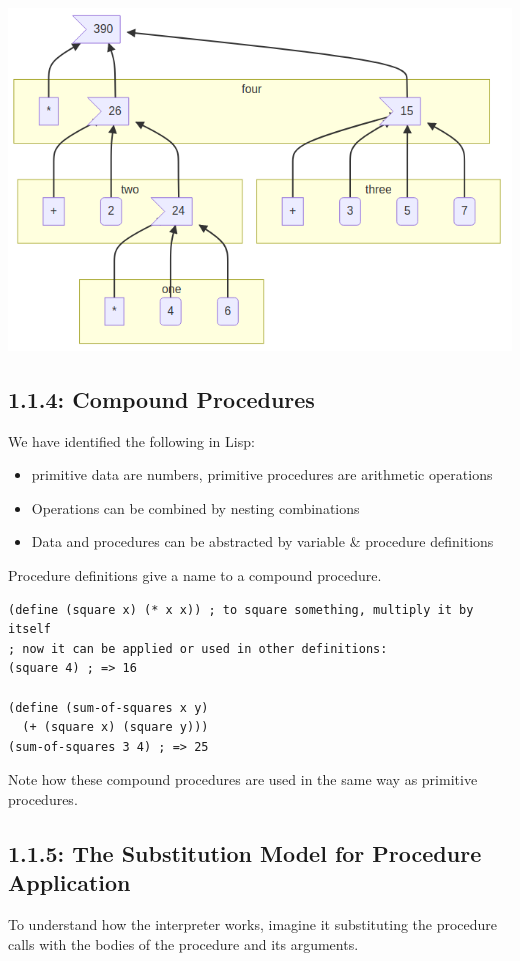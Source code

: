 \documentclass[final,fleqn,titlepage,twoside]{article}
\begin{document}
\begin{center}
\includegraphics[width=.9\linewidth]{1/fig/t_1-1-3.png}
\end{center}

\subsection{1.1.4: Compound Procedures}
\label{sec:orgc231c98}
We have identified the following in Lisp:
\begin{itemize}
\item primitive data are numbers, primitive procedures are arithmetic operations
\item Operations can be combined by nesting combinations
\item Data and procedures can be abstracted by variable \& procedure definitions
\end{itemize}

Procedure definitions give a name to a compound procedure.
\begin{verbatim}
(define (square x) (* x x)) ; to square something, multiply it by itself
; now it can be applied or used in other definitions:
(square 4) ; => 16

(define (sum-of-squares x y)
  (+ (square x) (square y)))
(sum-of-squares 3 4) ; => 25
\end{verbatim}

Note how these compound procedures are used in the same way as primitive
procedures.

\subsection{1.1.5: The Substitution Model for Procedure Application}
\label{sec:org39b56ff}
To understand how the interpreter works, imagine it substituting the procedure
calls with the bodies of the procedure and its arguments.
\end{document}
